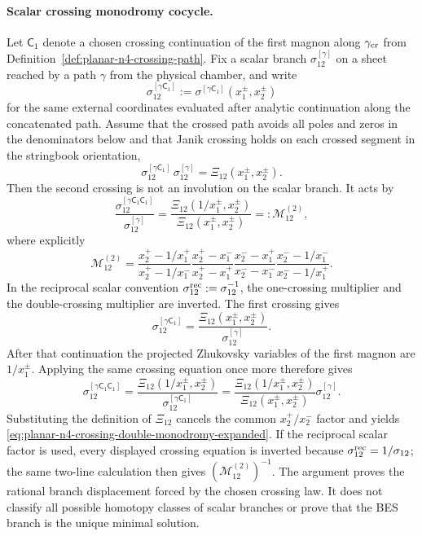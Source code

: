 \paragraph{Scalar crossing monodromy cocycle.}
Let \(\mathsf C_1\) denote a chosen crossing continuation of the first
magnon along \(\gamma_{\rm cr}\) from
Definition~\ref{def:planar-n4-crossing-path}.  Fix a scalar branch
\(\sigma^{[\gamma]}_{12}\) on a sheet reached by a path \(\gamma\) from the
physical chamber, and write
\[
  \sigma^{[\gamma\mathsf C_1]}_{12}
  :=
  \sigma^{[\gamma\mathsf C_1]}(x_1^\pm,x_2^\pm)
\]
for the same external coordinates evaluated after analytic continuation
along the concatenated path.  Assume that the crossed path avoids all poles
and zeros in the denominators below and that Janik crossing holds on each
crossed segment in the stringbook orientation,
\[
  \sigma^{[\gamma\mathsf C_1]}_{12}\,
  \sigma^{[\gamma]}_{12}
  =\Xi_{12}(x_1^\pm,x_2^\pm).
\]
Then the second crossing is not an involution on the scalar branch.  It acts
by
\begin{equation}
  \frac{\sigma^{[\gamma\mathsf C_1\mathsf C_1]}_{12}}
       {\sigma^{[\gamma]}_{12}}
  =
  \frac{\Xi_{12}(1/x_1^\pm,x_2^\pm)}
       {\Xi_{12}(x_1^\pm,x_2^\pm)}
  =:\mathcal M_{12}^{(2)},
  \label{eq:planar-n4-crossing-double-monodromy}
\end{equation}
where explicitly
\begin{equation}
  \mathcal M_{12}^{(2)}
  =
  \frac{x_2^+ -1/x_1^+}{x_2^+ -1/x_1^-}
  \frac{x_2^+ -x_1^-}{x_2^+ -x_1^+}
  \frac{x_2^- -x_1^+}{x_2^- -x_1^-}
  \frac{x_2^- -1/x_1^-}{x_2^- -1/x_1^+}.
  \label{eq:planar-n4-crossing-double-monodromy-expanded}
\end{equation}
In the reciprocal scalar convention
\(\sigma^{\rm rec}_{12}:=\sigma_{12}^{-1}\), the one-crossing multiplier
and the double-crossing multiplier are inverted.
The first crossing gives
\[
  \sigma^{[\gamma\mathsf C_1]}_{12}
  =
  \frac{\Xi_{12}(x_1^\pm,x_2^\pm)}
       {\sigma^{[\gamma]}_{12}} .
\]
After that continuation the projected Zhukovsky variables of the first
magnon are \(1/x_1^\pm\).  Applying the same crossing equation once more
therefore gives
\[
  \sigma^{[\gamma\mathsf C_1\mathsf C_1]}_{12}
  =
  \frac{\Xi_{12}(1/x_1^\pm,x_2^\pm)}
       {\sigma^{[\gamma\mathsf C_1]}_{12}}
  =
  \frac{\Xi_{12}(1/x_1^\pm,x_2^\pm)}
       {\Xi_{12}(x_1^\pm,x_2^\pm)}
  \sigma^{[\gamma]}_{12}.
\]
Substituting the definition of \(\Xi_{12}\) cancels the common
\(x_2^+/x_2^-\) factor and yields
\eqref{eq:planar-n4-crossing-double-monodromy-expanded}.  If the reciprocal
scalar factor is used, every displayed crossing equation is inverted because
\(\sigma^{\rm rec}_{12}=1/\sigma_{12}\); the same two-line calculation then
gives \((\mathcal M_{12}^{(2)})^{-1}\).  The argument proves the rational
branch displacement forced by the chosen crossing law.  It does not classify
all possible homotopy classes of scalar branches or prove that the BES
branch is the unique minimal solution.

